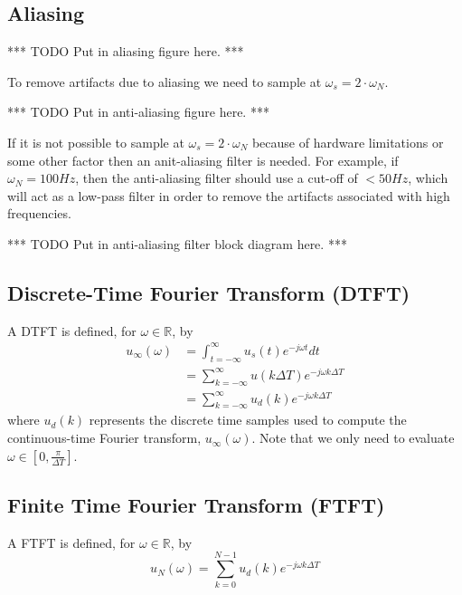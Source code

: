 \documentclass[lecture,12pt,]{pcms-l}
\newcommand{\tint}{\int_{t=-\infty}^\infty}
\newcommand{\w}{\omega}
\newcommand{\emjwt}{e^{-j\omega t}}
\begin{document}
\subsection{Aliasing}
*** TODO Put in aliasing figure here. ***

To remove artifacts due to aliasing we need to sample at $\w_s = 2\cdot\w_N$.

*** TODO Put in anti-aliasing figure here. ***

If it is not possible to sample at $\w_s = 2\cdot\w_N$ because of hardware limitations or some other factor then an anit-aliasing filter is needed. For example, if $\w_N = 100 Hz$, then the anti-aliasing filter should use a cut-off of $< 50 Hz$, which will act as a low-pass filter in order to remove the artifacts associated with high frequencies.

*** TODO Put in anti-aliasing filter block diagram here. ***

\subsection{Discrete-Time Fourier Transform (DTFT)}
A DTFT is defined, for $\w\in\mathbb{R}$, by
\begin{align*}
u_\infty(\w) &= \tint u_s(t)\emjwt dt \\
&= \sum_{k=-\infty}^\infty u(k\Delta T) e^{-j\w k\Delta T} \\
&= \sum_{k=-\infty}^\infty u_d(k) e^{-j\w k\Delta T}
\end{align*}
where $u_d(k)$ represents the discrete time samples used to compute the continuous-time Fourier transform, $u_\infty(\w)$. Note that we only need to evaluate $\w\in[0, \frac{\pi}{\Delta T}]$.

\subsection{Finite Time Fourier Transform (FTFT)}
A FTFT is defined, for $\w\in\mathbb{R}$, by
$$u_N(\w) = \sum_{k=0}^{N-1} u_d(k) e^{-j\w k\Delta T}$$
\end{document}
